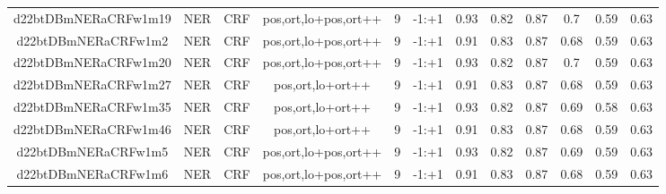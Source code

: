\documentclass[a4paper]{article}
\begin{document}
\begin{landscape}
\begin{center}
\begin{tabular}{ |c|c|c|c|c|c|c|c|c|c|c|c|}
 	
 
 	
 		
 		\small{ d22btDBmNERaCRFw1m19 } & NER & CRF & pos,ort,lo+pos,ort++  &  9 &  -1:+1  &  0.93 & 0.82 & 0.87  &  0.7 & 0.59 & 0.63 \\
 		

 	
 
 	
 		
 		\small{ d22btDBmNERaCRFw1m2 } & NER & CRF & pos,ort,lo+pos,ort++  &  9 &  -1:+1  &  0.91 & 0.83 & 0.87  &  0.68 & 0.59 & 0.63 \\
 		

 	
 
 	
 		
 		\small{ d22btDBmNERaCRFw1m20 } & NER & CRF & pos,ort,lo+pos,ort++  &  9 &  -1:+1  &  0.93 & 0.82 & 0.87  &  0.7 & 0.59 & 0.63 \\
 		

 	
 
 	
 		
 		\small{ d22btDBmNERaCRFw1m27 } & NER & CRF & pos,ort,lo+ort++  &  9 &  -1:+1  &  0.91 & 0.83 & 0.87  &  0.68 & 0.59 & 0.63 \\
 		

 	
 
 	
 		
 		\small{ d22btDBmNERaCRFw1m35 } & NER & CRF & pos,ort,lo+ort++  &  9 &  -1:+1  &  0.93 & 0.82 & 0.87  &  0.69 & 0.58 & 0.63 \\
 		

 	
 
 	
 		
 		\small{ d22btDBmNERaCRFw1m46 } & NER & CRF & pos,ort,lo+ort++  &  9 &  -1:+1  &  0.91 & 0.83 & 0.87  &  0.68 & 0.59 & 0.63 \\
 		

 	
 
 	
 		
 		\small{ d22btDBmNERaCRFw1m5 } & NER & CRF & pos,ort,lo+pos,ort++  &  9 &  -1:+1  &  0.93 & 0.82 & 0.87  &  0.69 & 0.59 & 0.63 \\
 		

 	
 
 	
 		
 		\small{ d22btDBmNERaCRFw1m6 } & NER & CRF & pos,ort,lo+pos,ort++  &  9 &  -1:+1  &  0.91 & 0.83 & 0.87  &  0.68 & 0.59 & 0.63 \\
 		
 \hline
\end{tabular}
\end{center}





\end{landscape}
\end{document}
